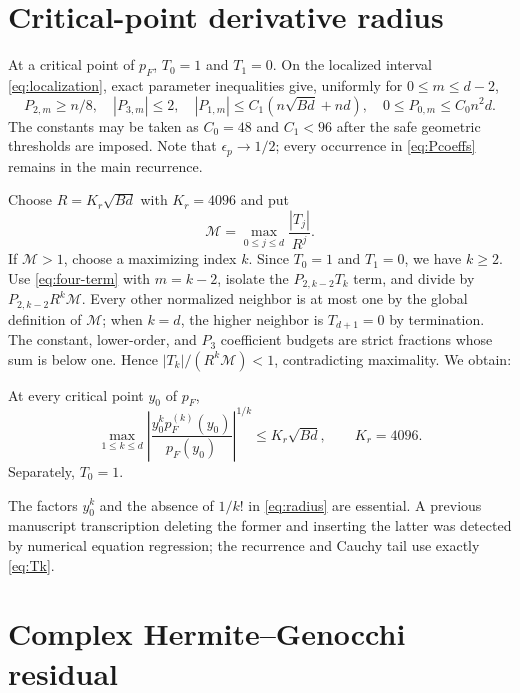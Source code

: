 \documentclass[12pt]{article}
\begin{document}
\section{Critical-point derivative radius}\label{sec:radius}

At a critical point of $p_F$, $T_0=1$ and $T_1=0$.  On the localized
interval \eqref{eq:localization}, exact parameter inequalities give,
uniformly for $0\le m\le d-2$,
\begin{equation}\label{eq:recurrence-bounds}
 P_{2,m}\ge n/8,\quad |P_{3,m}|\le2,\quad
 |P_{1,m}|\le C_1(n\sqrt{Bd}+nd),\quad
 0\le P_{0,m}\le C_0n^2d.
\end{equation}
The constants may be taken as $C_0=48$ and $C_1<96$ after the safe geometric
thresholds are imposed.  Note that $\epsilon_p\to1/2$; every occurrence in
\eqref{eq:Pcoeffs} remains in the main recurrence.

Choose $R=K_r\sqrt{Bd}$ with $K_r=4096$ and put
\[
 \mathcal M=\max_{0\le j\le d}\frac{|T_j|}{R^j}.
\]
If $\mathcal M>1$, choose a maximizing index $k$.  Since $T_0=1$ and
$T_1=0$, we have $k\ge2$.  Use \eqref{eq:four-term} with $m=k-2$, isolate
the $P_{2,k-2}T_k$ term, and divide by
$P_{2,k-2}R^k\mathcal M$.  Every other normalized neighbor is at most one
by the global definition of $\mathcal M$; when $k=d$, the higher neighbor is
$T_{d+1}=0$ by termination.  The constant, lower-order, and $P_3$ coefficient
budgets are strict fractions whose sum is below one.  Hence
$|T_k|/(R^k\mathcal M)<1$, contradicting maximality.  We obtain:

\begin{proposition}\label{prop:radius}
At every critical point $y_0$ of $p_F$,
\begin{equation}\label{eq:radius}
 \max_{1\le k\le d}
 \left|\frac{y_0^kp_F^{(k)}(y_0)}{p_F(y_0)}\right|^{1/k}
 \le K_r\sqrt{Bd},\qquad K_r=4096.
\end{equation}
Separately, $T_0=1$.
\end{proposition}

The factors $y_0^k$ and the absence of $1/k!$ in \eqref{eq:radius} are
essential.  A previous manuscript transcription deleting the former and
inserting the latter was detected by numerical equation regression; the
recurrence and Cauchy tail use exactly \eqref{eq:Tk}.

\section{Complex Hermite--Genocchi residual}\label{sec:residual}
\end{document}
